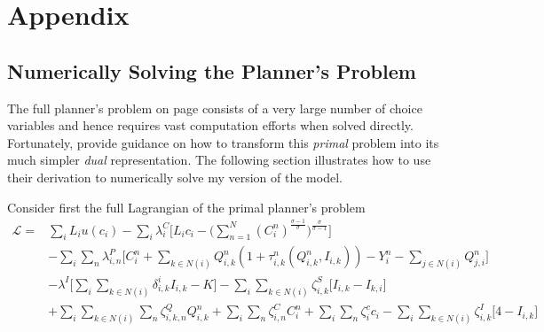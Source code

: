 \documentclass[11pt, oneside]{article}   	%
\begin{document}
  \section*{Appendix}
\begin{spacing}{1.3}
  \subsection{Numerically Solving the Planner's Problem}
  \label{chapter:APP:math}


The full planner's problem on page \pageref{planner_problem} consists of a very large number of choice variables and hence requires vast computation efforts when solved directly. Fortunately, \cite{fajgelbaum_optimal_2017} provide guidance on how to transform this \emph{primal} problem into its much simpler \emph{dual} representation. The following section illustrates how to use their derivation to numerically solve my version of the model.

Consider first the full Lagrangian of the primal planner's problem
\begin{equation}
  \begin{aligned}
    \mathcal{L} ={} & \sum_{i}^{} L_{i}u(c_{i}) - \sum_{i}^{}\lambda^{C}_{i}\bigg[L_{i}c_{i} - \bigg( \sum_{n=1}^{N} (C_{i}^{n})^{\frac{\sigma-1}{\sigma}}\bigg)^{\frac{\sigma}{\sigma-1}} \bigg] \\
  & - \sum_{i}^{}\sum_{n}^{}\lambda^{P}_{i,n}\bigg[ C_{i}^{n} + \sum_{k\in N(i)}^{}Q_{i,k}^{n}(1+\tau_{i,k}^{n}(Q_{i,k}^{n}, I_{i,k})) - Y_{i}^{n} - \sum_{j\in N(i)}^{}Q_{j,i}^{n} \bigg] \\
  & - \lambda^{I}\bigg[\sum_{i}^{}\sum_{k\in N(i)}^{}\delta^{i}_{i,k}I_{i,k} - K \bigg] - \sum_{i}^{}\sum_{k \in N(i)}^{}\zeta^{S}_{i,k}\bigg[ I_{i,k} - I_{k,i} \bigg] \\
  & + \sum_{i}^{}\sum_{k \in N(i)}^{}\sum_{n}^{} \zeta^{Q}_{i,k,n}Q_{i,k}^{n} + \sum_{i}^{}\sum_{n}^{} \zeta^{C}_{i,n}C_{i}^{n} + \sum_{i}^{}\sum_{n}^{} \zeta^{c}_{i}c_{i} - \sum_{i}^{}\sum_{k \in N(i)}^{} \zeta^{I}_{i,k}\bigg[4-I_{i,k}\bigg]
  \end{aligned}
\end{equation}


\end{spacing}
\end{document}

